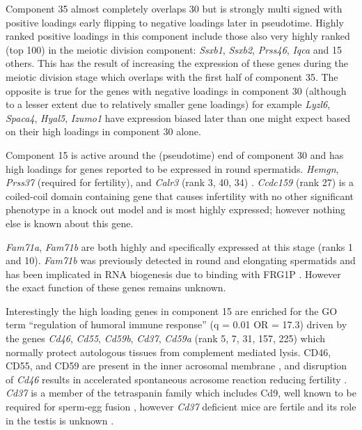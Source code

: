 Component 35 almost completely overlaps 30 but is strongly multi signed with positive loadings early flipping to negative loadings later in pseudotime.
Highly ranked positive loadings in this component include those also very highly ranked (top 100) in the meiotic division component: \textit{Ssxb1}, \textit{Ssxb2}, \textit{Prss46}, \textit{Iqca} and 15 others.
This has the result of increasing the expression of these genes during the meiotic division stage which overlaps with the first half of component 35.
The opposite is true for the genes with negative loadings in component 30 (although to a lesser extent due to relatively smaller gene loadings) for example \textit{Lyzl6}, \textit{Spaca4}, \textit{Hyal5}, \textit{Izumo1} have expression biased later than one might expect based on their high loadings in component 30 alone.

Component 15 is active around the (pseudotime) end of component 30 and has high loadings for genes reported to be expressed in round spermatids.
\textit{Hemgn}, \textit{Prss37} (required for fertility), and \textit{Calr3} (rank 3, 40, 34) \parencite{Shen2013Prss37}.
\textit{Ccdc159} (rank 27) is a coiled-coil domain containing gene that causes infertility with no other significant phenotype in a knock out model and is most highly expressed; however nothing else is known about this gene.

\textit{Fam71a}, \textit{Fam71b} are both highly and specifically expressed at this stage (ranks 1 and 10).
\textit{Fam71b} was previously detected in round and elongating spermatids \parencite{Petit2015Combining} and has been implicated in RNA biogenesis due to binding with FRG1P \parencite{vanKoningsbruggen2007FRG1Pmediated}.
However the exact function of these genes remains unknown.

Interestingly the high loading genes in component 15 are enriched for the GO term ``regulation of humoral immune response'' (q = 0.01 OR = 17.3) driven by the genes \textit{Cd46}, \textit{Cd55}, \textit{Cd59b}, \textit{Cd37}, \textit{Cd59a} (rank 5, 7, 31, 157, 225) which normally protect autologous tissues from complement mediated lysis.
CD46, CD55, and CD59 are present in the inner acrosomal membrane \parencite{Cummerson2006complement}, and disruption of \textit{Cd46} results in accelerated spontaneous acrosome reaction reducing fertility \parencite{Inoue2003Disruption}.
\textit{Cd37} is a member of the tetraspanin family which includes Cd9, well known to be required for sperm-egg fusion \parencite{Kaji2000gamete, Naour2000Severely, Miyado2000Requirement}, however \textit{Cd37} deficient mice are fertile and its role in the testis is unknown \parencite{Knobeloch2000Targeted}.

